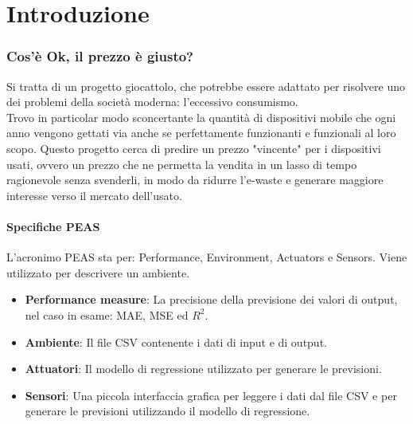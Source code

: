 \documentclass{article}
\author{\begin{center}
    \texttt{[image: images/logo\_upscaled.jpeg]}
\end{center}\\Antonio Renzullo\\
\url{https://github.com/Ariethel/Ok-il-prezzo-giusto-.git}}
\date{}
\begin{document}
    \begin{titlepage}
        \maketitle
    \end{titlepage}
    \tableofcontents
\newpage
\part{Introduzione}
    \section{Cos'è Ok, il prezzo è giusto?\\}
        Si tratta di un progetto giocattolo, che potrebbe essere adattato per risolvere uno dei problemi della società moderna: l'eccessivo consumismo.\\ Trovo in particolar modo sconcertante la quantità di dispositivi mobile che ogni anno vengono gettati via anche se perfettamente funzionanti e funzionali al loro scopo. Questo progetto cerca di predire un prezzo "vincente" per i dispositivi usati, ovvero un prezzo che ne permetta la vendita in un lasso di tempo ragionevole senza svenderli, in modo da ridurre l'e-waste e generare maggiore interesse verso il mercato dell'usato.
    \subsection{Specifiche PEAS}
        L’acronimo PEAS sta per: Performance, Environment, Actuators e Sensors. Viene utilizzato per descrivere un ambiente.
        \begin{itemize}
            \item \textbf{Performance measure}: La precisione della previsione dei valori di output, nel caso in esame: MAE, MSE ed $R^2$.
            \item \textbf{Ambiente}: Il file CSV contenente i dati di input e di output.
            \item \textbf{Attuatori}: Il modello di regressione utilizzato per generare le previsioni.
            \item \textbf{Sensori}: Una piccola interfaccia grafica per leggere i dati dal file CSV e per generare le previsioni utilizzando il modello di regressione.
        \end{itemize}
\end{document}
